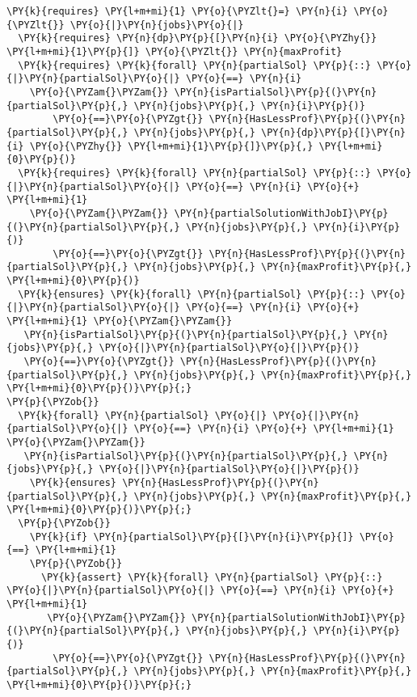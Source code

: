 \begin{itemize}
\begin{Verbatim}[commandchars=\\\{\},fontsize=\footnotesize]
  \PY{k}{requires} \PY{l+m+mi}{1} \PY{o}{\PYZlt{}=} \PY{n}{i} \PY{o}{\PYZlt{}} \PY{o}{|}\PY{n}{jobs}\PY{o}{|}
  \PY{k}{requires} \PY{n}{dp}\PY{p}{[}\PY{n}{i} \PY{o}{\PYZhy{}} \PY{l+m+mi}{1}\PY{p}{]} \PY{o}{\PYZlt{}} \PY{n}{maxProfit}
  \PY{k}{requires} \PY{k}{forall} \PY{n}{partialSol} \PY{p}{::} \PY{o}{|}\PY{n}{partialSol}\PY{o}{|} \PY{o}{==} \PY{n}{i}
    \PY{o}{\PYZam{}\PYZam{}} \PY{n}{isPartialSol}\PY{p}{(}\PY{n}{partialSol}\PY{p}{,} \PY{n}{jobs}\PY{p}{,} \PY{n}{i}\PY{p}{)} 
        \PY{o}{==}\PY{o}{\PYZgt{}} \PY{n}{HasLessProf}\PY{p}{(}\PY{n}{partialSol}\PY{p}{,} \PY{n}{jobs}\PY{p}{,} \PY{n}{dp}\PY{p}{[}\PY{n}{i} \PY{o}{\PYZhy{}} \PY{l+m+mi}{1}\PY{p}{]}\PY{p}{,} \PY{l+m+mi}{0}\PY{p}{)}
  \PY{k}{requires} \PY{k}{forall} \PY{n}{partialSol} \PY{p}{::} \PY{o}{|}\PY{n}{partialSol}\PY{o}{|} \PY{o}{==} \PY{n}{i} \PY{o}{+} \PY{l+m+mi}{1} 
    \PY{o}{\PYZam{}\PYZam{}} \PY{n}{partialSolutionWithJobI}\PY{p}{(}\PY{n}{partialSol}\PY{p}{,} \PY{n}{jobs}\PY{p}{,} \PY{n}{i}\PY{p}{)} 
        \PY{o}{==}\PY{o}{\PYZgt{}} \PY{n}{HasLessProf}\PY{p}{(}\PY{n}{partialSol}\PY{p}{,} \PY{n}{jobs}\PY{p}{,} \PY{n}{maxProfit}\PY{p}{,} \PY{l+m+mi}{0}\PY{p}{)}
  \PY{k}{ensures} \PY{k}{forall} \PY{n}{partialSol} \PY{p}{::} \PY{o}{|}\PY{n}{partialSol}\PY{o}{|} \PY{o}{==} \PY{n}{i} \PY{o}{+} \PY{l+m+mi}{1} \PY{o}{\PYZam{}\PYZam{}}
   \PY{n}{isPartialSol}\PY{p}{(}\PY{n}{partialSol}\PY{p}{,} \PY{n}{jobs}\PY{p}{,} \PY{o}{|}\PY{n}{partialSol}\PY{o}{|}\PY{p}{)} 
   \PY{o}{==}\PY{o}{\PYZgt{}} \PY{n}{HasLessProf}\PY{p}{(}\PY{n}{partialSol}\PY{p}{,} \PY{n}{jobs}\PY{p}{,} \PY{n}{maxProfit}\PY{p}{,} \PY{l+m+mi}{0}\PY{p}{)}\PY{p}{;}
\PY{p}{\PYZob{}}
  \PY{k}{forall} \PY{n}{partialSol} \PY{o}{|} \PY{o}{|}\PY{n}{partialSol}\PY{o}{|} \PY{o}{==} \PY{n}{i} \PY{o}{+} \PY{l+m+mi}{1} \PY{o}{\PYZam{}\PYZam{}}
   \PY{n}{isPartialSol}\PY{p}{(}\PY{n}{partialSol}\PY{p}{,} \PY{n}{jobs}\PY{p}{,} \PY{o}{|}\PY{n}{partialSol}\PY{o}{|}\PY{p}{)}
    \PY{k}{ensures} \PY{n}{HasLessProf}\PY{p}{(}\PY{n}{partialSol}\PY{p}{,} \PY{n}{jobs}\PY{p}{,} \PY{n}{maxProfit}\PY{p}{,} \PY{l+m+mi}{0}\PY{p}{)}\PY{p}{;}
  \PY{p}{\PYZob{}}
    \PY{k}{if} \PY{n}{partialSol}\PY{p}{[}\PY{n}{i}\PY{p}{]} \PY{o}{==} \PY{l+m+mi}{1}
    \PY{p}{\PYZob{}}
      \PY{k}{assert} \PY{k}{forall} \PY{n}{partialSol} \PY{p}{::} \PY{o}{|}\PY{n}{partialSol}\PY{o}{|} \PY{o}{==} \PY{n}{i} \PY{o}{+} \PY{l+m+mi}{1}
       \PY{o}{\PYZam{}\PYZam{}} \PY{n}{partialSolutionWithJobI}\PY{p}{(}\PY{n}{partialSol}\PY{p}{,} \PY{n}{jobs}\PY{p}{,} \PY{n}{i}\PY{p}{)}
        \PY{o}{==}\PY{o}{\PYZgt{}} \PY{n}{HasLessProf}\PY{p}{(}\PY{n}{partialSol}\PY{p}{,} \PY{n}{jobs}\PY{p}{,} \PY{n}{maxProfit}\PY{p}{,} \PY{l+m+mi}{0}\PY{p}{)}\PY{p}{;}

\end{Verbatim}
\end{itemize}
